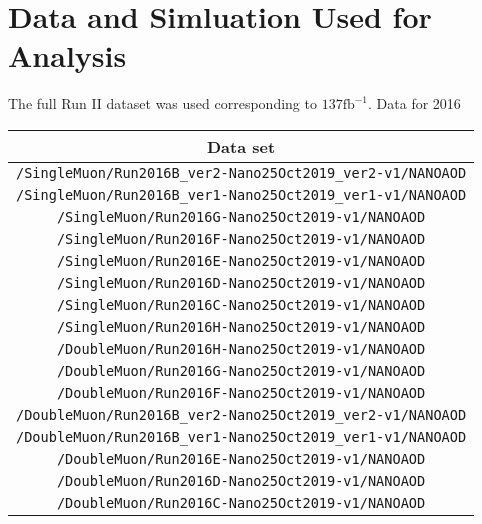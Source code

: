 \section{Data and Simluation Used for Analysis}
The full Run II dataset was used corresponding to $137 \text{fb}^{-1}$.
Data for 2016
\begin{table}[!h]
\label{tab:datasets2016}
\begin{center}
{\footnotesize
\begin{tabular}{c}
\hline
Data set  \\
\hline
\texttt{/SingleMuon/Run2016B\_ver2-Nano25Oct2019\_ver2-v1/NANOAOD} \\
\texttt{/SingleMuon/Run2016B\_ver1-Nano25Oct2019\_ver1-v1/NANOAOD}   \\
\texttt{/SingleMuon/Run2016G-Nano25Oct2019-v1/NANOAOD} \\
\texttt{/SingleMuon/Run2016F-Nano25Oct2019-v1/NANOAOD} \\
\texttt{/SingleMuon/Run2016E-Nano25Oct2019-v1/NANOAOD} \\
\texttt{/SingleMuon/Run2016D-Nano25Oct2019-v1/NANOAOD} \\
\texttt{/SingleMuon/Run2016C-Nano25Oct2019-v1/NANOAOD} \\
\texttt{/SingleMuon/Run2016H-Nano25Oct2019-v1/NANOAOD} \\
\texttt{/DoubleMuon/Run2016H-Nano25Oct2019-v1/NANOAOD} \\
\texttt{/DoubleMuon/Run2016G-Nano25Oct2019-v1/NANOAOD} \\
\texttt{/DoubleMuon/Run2016F-Nano25Oct2019-v1/NANOAOD} \\
\texttt{/DoubleMuon/Run2016B\_ver2-Nano25Oct2019\_ver2-v1/NANOAOD} \\
\texttt{/DoubleMuon/Run2016B\_ver1-Nano25Oct2019\_ver1-v1/NANOAOD} \\
\texttt{/DoubleMuon/Run2016E-Nano25Oct2019-v1/NANOAOD} \\
\texttt{/DoubleMuon/Run2016D-Nano25Oct2019-v1/NANOAOD} \\
\texttt{/DoubleMuon/Run2016C-Nano25Oct2019-v1/NANOAOD} \\
\hline
\end{tabular}
} %
\end{center}
\end{table}

